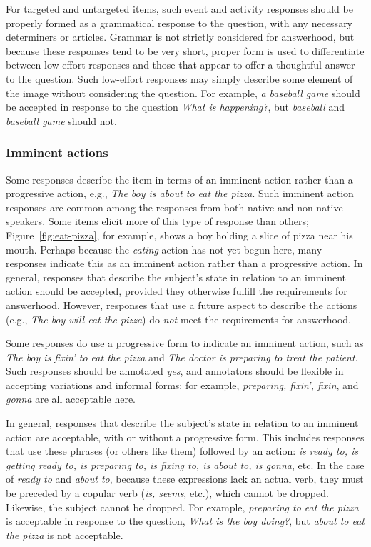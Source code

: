 \documentclass[12pt]{article}
\begin{document}
For targeted and untargeted items, such event and activity responses should be properly formed as a grammatical response to the question, with any necessary determiners or articles. Grammar is not strictly considered for answerhood, but because these responses tend to be very short, proper form is used to differentiate between low-effort responses and those that appear to offer a thoughtful answer to the question. Such low-effort responses may simply describe some element of the image without considering the question. For example, \textit{a baseball game} should be accepted in response to the question \textit{What is happening?}, but \textit{baseball} and \textit{baseball game} should not.

\subsubsection{Imminent actions}
\label{subsubsection:answerhood-imminent}
Some responses describe the item in terms of an imminent action rather than a progressive action, e.g., \textit{The boy is about to eat the pizza}. Such imminent action responses are common among the responses from both native and non-native speakers. Some items elicit more of this type of response than others; Figure~\ref{fig:eat-pizza}, for example, shows a boy holding a slice of pizza near his mouth. Perhaps because the \textit{eating} action has not yet begun here, many responses indicate this as an imminent action rather than a progressive action. In general, responses that describe the subject's state in relation to an imminent action should be accepted, provided they otherwise fulfill the requirements for answerhood. However, responses that use a future aspect to describe the actions (e.g., \textit{The boy will eat the pizza}) do \textit{not} meet the requirements for answerhood.

Some responses do use a progressive form to indicate an imminent action, such as \textit{The boy is fixin' to eat the pizza} and \textit{The doctor is preparing to treat the patient}. Such responses should be annotated \textit{yes}, and annotators should be flexible in accepting variations and informal forms; for example, \textit{preparing, fixin', fixin}, and \textit{gonna} are all acceptable here.

In general, responses that describe the subject's state in relation to an imminent action are acceptable, with or without a progressive form. This includes responses that use these phrases (or others like them) followed by an action: \textit{is ready to, is getting ready to, is preparing to, is fixing to, is about to, is gonna}, etc. In the case of \textit{ready to} and \textit{about to}, because these expressions lack an actual verb, they must be preceded by a copular verb (\textit{is, seems}, etc.), which cannot be dropped. Likewise, the subject cannot be dropped. For example, \textit{preparing to eat the pizza} is acceptable in response to the question, \textit{What is the boy doing?}, but \textit{about to eat the pizza} is not acceptable.
\end{document}
